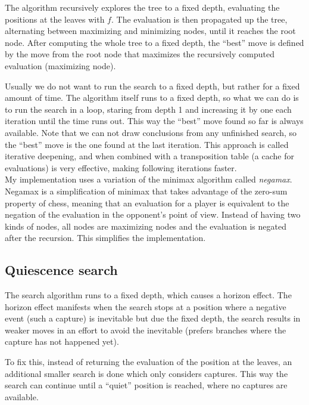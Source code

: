 The algorithm recursively explores the tree to a fixed depth, evaluating the positions at the leaves with $f$. The evaluation is then propagated up the tree, alternating between maximizing and minimizing nodes, until it reaches the root node. After computing the whole tree to a fixed depth, the \enquote{best} move is defined by the move from the root node that maximizes the recursively computed evaluation (maximizing node).

Usually we do not want to run the search to a fixed depth, but rather for a fixed amount of time. The algorithm itself runs to a fixed depth, so what we can do is to run the search in a loop, staring from depth 1 and increasing it by one each iteration until the time runs out. This way the \enquote{best} move found so far is always available. Note that we can not draw conclusions from any unfinished search, so the \enquote{best} move is the one found at the last iteration. This approach is called iterative deepening, and when combined with a transposition table (a cache for evaluations) is very effective, making following iterations faster. \\

My implementation uses a variation of the minimax algorithm called \textit{negamax}. Negamax is a simplification of minimax that takes advantage of the zero-sum property of chess, meaning that an evaluation for a player is equivalent to the negation of the evaluation in the opponent's point of view. Instead of having two kinds of nodes, all nodes are maximizing nodes and the evaluation is negated after the recursion. This simplifies the implementation.

\subsection{Quiescence search}

The search algorithm runs to a fixed depth, which causes a horizon effect. The horizon effect manifests when the search stops at a position where a negative event (such a capture) is inevitable but due the fixed depth, the search results in weaker moves in an effort to avoid the inevitable (prefers branches where the capture has not happened yet).

To fix this, instead of returning the evaluation of the position at the leaves, an additional smaller search is done which only considers captures. This way the search can continue until a \enquote{quiet} position is reached, where no captures are available.

